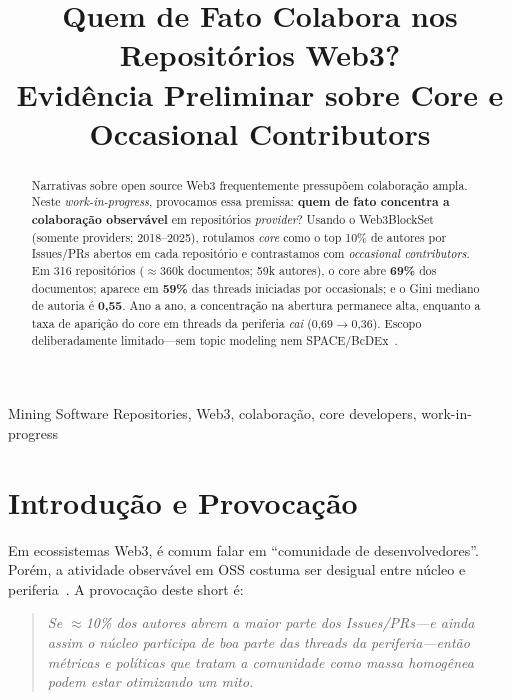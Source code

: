 \documentclass[10pt,conference]{IEEEtran}
\begin{document}
\title{Quem de Fato Colabora nos Repositórios Web3?\\
Evidência Preliminar sobre Core e Occasional Contributors}

\author{
}

\maketitle

\begin{abstract}
Narrativas sobre open source Web3 frequentemente pressupõem colaboração ampla. Neste \emph{work-in-progress}, provocamos essa premissa: \textbf{quem de fato concentra a colaboração observável} em repositórios \emph{provider}? Usando o Web3BlockSet~\cite{soares2026web3blockset} (somente providers; 2018--2025), rotulamos \emph{core} como o top 10\% de autores por Issues/PRs abertos em cada repositório e contrastamos com \emph{occasional contributors}. Em 316 repositórios ($\approx$360k documentos; 59k autores), o core abre \textbf{69\%} dos documentos; aparece em \textbf{59\%} das threads iniciadas por occasionals; e o Gini mediano de autoria é \textbf{0,55}. Ano a ano, a concentração na abertura permanece alta, enquanto a taxa de aparição do core em threads da periferia \emph{cai} (0,69$\rightarrow$0,36). Escopo deliberadamente limitado---sem topic modeling nem SPACE/BcDEx~\cite{soares2025bcdex}.
\end{abstract}

\begin{IEEEkeywords}
Mining Software Repositories, Web3, colaboração, core developers, work-in-progress
\end{IEEEkeywords}

\section{Introdução e Provocação}

Em ecossistemas Web3, é comum falar em ``comunidade de desenvolvedores''. Porém, a atividade observável em OSS costuma ser desigual entre núcleo e periferia~\cite{das2022blockchain,joblin2017classifying}. A provocação deste short é:

\begin{quote}
\emph{Se $\approx$10\% dos autores abrem a maior parte dos Issues/PRs---e ainda assim o núcleo participa de boa parte das threads da periferia---então métricas e políticas que tratam a comunidade como massa homogênea podem estar otimizando um mito.}
\end{quote}
\end{document}
